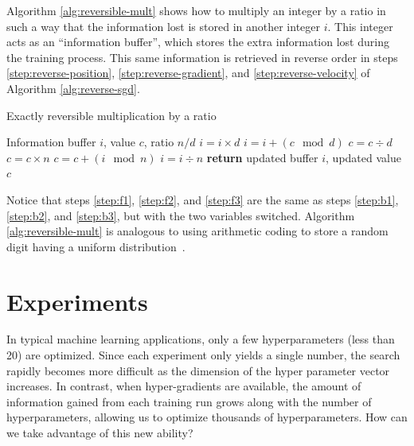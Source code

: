 \documentclass{article}
\newcommand{\decay}{\gamma}
\begin{document}
Algorithm \ref{alg:reversible-mult} shows how to multiply an integer by a ratio in such a way that the information lost is stored in another integer $i$.
This integer acts as an ``information buffer'', which stores the extra information lost during the training process.
This same information is retrieved in reverse order in steps \ref{step:reverse-position}, \ref{step:reverse-gradient}, and \ref{step:reverse-velocity} of Algorithm \ref{alg:reverse-sgd}.

%
\begin{algorithm}
   \caption{Exactly reversible multiplication by a ratio}
   \label{alg:reversible-mult}
\begin{algorithmic}[1]
    Information buffer $i$, value $c$, ratio $n / d$
   \State $i = i \times d$                \label{step:f1}
   \State $i = i + (c \! \mod d)$    \label{step:f2}
   \State $c = c \div d$                    \label{step:f3}
   \State $c = c \times n$                  \label{step:b1}
   \State $c = c +  (i \! \mod n)$          \label{step:b2}
   \State $i = i \div n$               \label{step:b3}
   \State \textbf{return} updated buffer $i$, updated value $c$
\end{algorithmic}
\end{algorithm}
%

Notice that steps \ref{step:f1}, \ref{step:f2}, and \ref{step:f3} are the same as steps \ref{step:b1}, \ref{step:b2}, and \ref{step:b3}, but with the two variables switched.
%
%
Algorithm \ref{alg:reversible-mult} is analogous to using arithmetic coding to store a random digit having a uniform distribution~\citep{steinruecken2014a}.

\section{Experiments}

In typical machine learning applications, only a few hyperparameters (less than 20) are optimized.
Since each experiment only yields a single number, the search rapidly becomes more difficult as the dimension of the hyper parameter vector increases.
In contrast, when hyper-gradients are available, the amount of information gained from each training run grows along with the number of hyperparameters, allowing us to optimize thousands of hyperparameters.%
How can we take advantage of this new ability?
\end{document}
